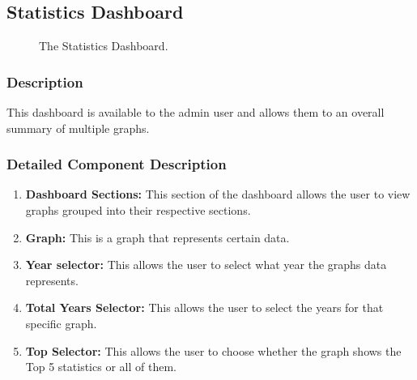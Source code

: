 \documentclass[14pt, a4paper]{article}
\begin{document}
\subsection{Statistics Dashboard}
	\begin{figure}[H]
		\centerline{}
		\caption{The Statistics Dashboard.}
		\label{fig:dash1}
	\end{figure}
	\subsubsection{Description} This dashboard is available to the admin user and allows them to an overall summary of multiple graphs.
	\subsubsection{Detailed Component Description}
		\begin{enumerate}
			\item \textbf{Dashboard Sections:} This section of the dashboard allows the user to view graphs grouped into their respective sections. 
			\item \textbf{Graph:} This is a graph that represents certain data.
			\item \textbf{Year selector: } This allows the user to select what year the graphs data represents.
			\item \textbf{Total Years Selector: } This allows the user to select the years for that specific graph.
			\item \textbf{Top Selector:} This allows the user to choose whether the graph shows the Top 5 statistics or all of them.
		\end{enumerate}
\end{document}
